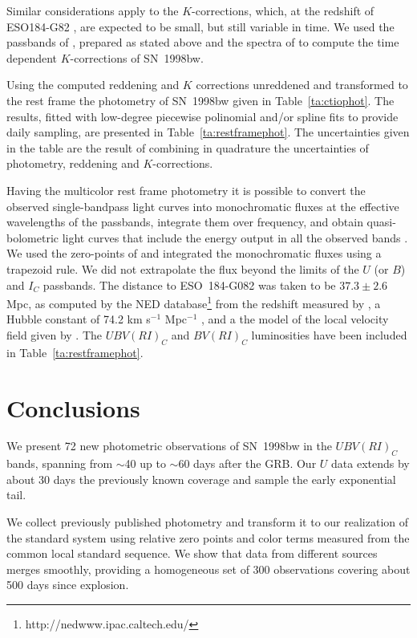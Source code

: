\documentclass[12pt,preprint]{aastex}
\begin{document}
Similar considerations apply to the $K$-corrections, which, at the redshift of ESO184-G82 \citep[$z =$ 0.0087,][]{fetal06}, are expected to be small,
but still variable in time.
%
We used the passbands of \citet{bessell90}, prepared as stated above and the spectra of \citet{petal01} to compute the
time dependent $K$-corrections of SN~1998bw.

Using the computed reddening and $K$ corrections unreddened and transformed to the rest frame the photometry of SN~1998bw
given in Table~\ref{ta:ctiophot}.
%
The results, fitted with
low-degree piecewise polinomial and/or spline fits to provide daily sampling, are presented in Table~\ref{ta:restframephot}.
%
The uncertainties given in the table are the result of combining in quadrature the uncertainties of photometry, reddening and $K$-corrections.

Having the multicolor rest frame photometry it is possible to 
convert the observed single-bandpass light curves into
monochromatic fluxes at the effective wavelengths of the passbands,
integrate them over frequency, and obtain quasi-bolometric light curves
that include the energy output in all the observed bands
\citep{sandb90}.
%
We used the zero-points of \citet{bessell00} and integrated the monochromatic fluxes using a trapezoid rule.
%
We did not extrapolate the flux beyond the limits of the $U$ (or $B$) and $I_C$ passbands.
%
The distance to ESO~184-G082 was taken to be $37.3 \pm 2.6$ Mpc, as computed by the NED database\footnote{http://nedwww.ipac.caltech.edu/}
from the redshift measured by \citet{fetal06},
a Hubble constant of 74.2 km s$^{-1}$ Mpc$^{-1}$ \citep{retal09}, and a the model of the local velocity field given by \citet{metal00}.
%
The $UBV(RI)_C$ and $BV(RI)_C$ luminosities have been included in Table~\ref{ta:restframephot}.

\section{Conclusions} \label{se:conclusions}

We present 72 new photometric observations of SN~1998bw in the $UBV(RI)_C$ bands, spanning from $\sim$40 up to $\sim$60 days after the GRB.
%
Our $U$ data extends by about 30 days the previously known coverage and sample the early exponential tail.

We collect previously published photometry and transform it to our realization of the standard system using relative zero points and color
terms measured from the common local standard sequence.
%
We show that data from different sources merges smoothly, providing a homogeneous set of 300 observations covering about 500 days since explosion.
\end{document}

